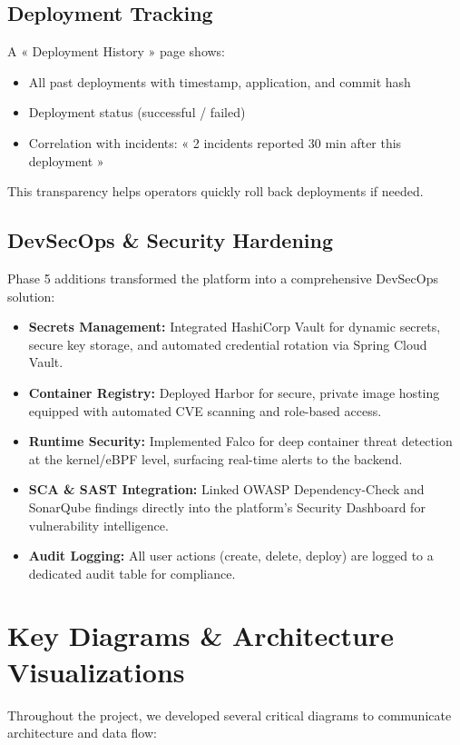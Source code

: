 \documentclass[12pt,a4paper]{report}
\begin{document}
\subsection{Deployment Tracking}

A « Deployment History » page shows:
\begin{itemize}
  \item All past deployments with timestamp, application, and commit hash
  \item Deployment status (successful / failed)
  \item Correlation with incidents: « 2 incidents reported 30 min after this deployment »
\end{itemize}

This transparency helps operators quickly roll back deployments if needed.

\subsection{DevSecOps \& Security Hardening}

Phase 5 additions transformed the platform into a comprehensive DevSecOps solution:
\begin{itemize}
  \item \textbf{Secrets Management:} Integrated HashiCorp Vault for dynamic secrets, secure key storage, and automated credential rotation via Spring Cloud Vault.
  \item \textbf{Container Registry:} Deployed Harbor for secure, private image hosting equipped with automated CVE scanning and role-based access.
  \item \textbf{Runtime Security:} Implemented Falco for deep container threat detection at the kernel/eBPF level, surfacing real-time alerts to the backend.
  \item \textbf{SCA \& SAST Integration:} Linked OWASP Dependency-Check and SonarQube findings directly into the platform's Security Dashboard for vulnerability intelligence.
  \item \textbf{Audit Logging:} All user actions (create, delete, deploy) are logged to a dedicated audit table for compliance.
\end{itemize}

\section{Key Diagrams \& Architecture Visualizations}

Throughout the project, we developed several critical diagrams to communicate architecture and data flow:
\end{document}

